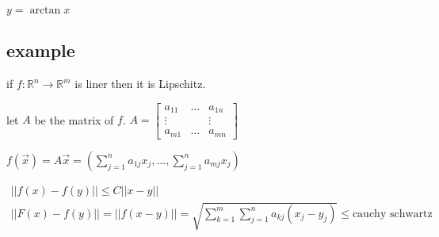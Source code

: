 \documentclass[letterpaper]{article}
\begin{document}
$y=\arctan x$

\subsection*{example}
if $f:\mathbb{R}^n\to\mathbb{R}^m$ is liner then it is Lipschitz.

let $A$ be the matrix of $f$. 
$A=\left[\begin{array}{ccc}a_{11}&\hdots&a_{1n}\\\vdots&&\vdots\\a_{m1}&\hdots&a_{mn}\end{array}\right]$

$f(\vec{x})=A\vec{x}=\left(\sum\limits_{j=1}^n{a_{1j}x_j},\dots,\sum\limits_{j=1}^n{a_{mj}x_j}\right)$

\begin{align*}
  ||f(x)-f(y)||\le C||x-y||\\
  ||F(x)-f(y)||=||f(x-y)||=\sqrt{\sum\limits_{k=1}^m{\sum\limits_{j=1}^n{a_{kj}(x_j-y_j)}}}\le\text{cauchy schwartz}
\end{align*}
\end{document}
